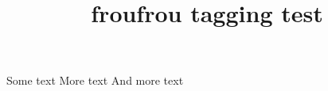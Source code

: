 \documentclass{article}
\title{froufrou tagging test}
\begin{document}
Some text
\froufrou
More text
\froufrou[dinkus]
And more text
\froufrou[closing]
\end{document}
